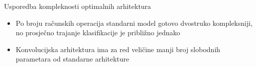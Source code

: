 \documentclass[pdf]{beamer}
\begin{document}
\begin{frame}{Usporedba kompleknosti optimalnih arhitektura}


\begin{table}
\begin{center}
\centering
{}
\end{center}
\end{table}

\begin{itemize}
\setlength\itemsep{0.5em}

	\item  Po broju računskih operacija standarni model gotovo dvostruko kompleksniji, no prosječno trajanje klasifikacije je približno jednako
	
	\item Konvolucijska arhitektura ima za red veličine manji broj slobodnih parametara od standarne arhitekture
	
\end{itemize}


\end{frame}
\end{document}
